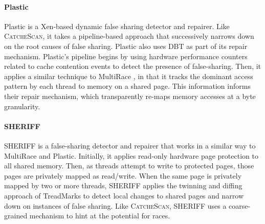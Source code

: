 \documentclass{sig-alternate}
\newcommand{\TextToolname}{CatcheScan}
\newcommand{\Toolname}{\textsc{\TextToolname{}}}
\begin{document}
\paragraph{Plastic}
Plastic \cite{Plastic} is a Xen-based dynamic false sharing detector and repairer. Like \Toolname{}, it takes a pipeline-based
approach that successively narrows down on the root causes of false sharing. Plastic also uses DBT as part of its
repair mechanism. Plastic's pipeline begins by using hardware performance counters related to cache contention
events to detect the presence of false-sharing. Then, it applies a similar technique to MultiRace \cite{MultiRace}, in
that it tracks the dominant access pattern by each thread to memory on a shared page. This information informs
their repair mechanism, which transparently re-maps memory accesses at a byte granularity.

\paragraph{SHERIFF}
SHERIFF \cite{SHERIFF} is a false-sharing detector and repairer that works in a similar way to MultiRace and Plastic. Initially,
it applies read-only hardware page protection to all shared memory. Then, as threads attempt to write to protected pages, those
pages are privately mapped as read/write. When the same page is privately mapped by two or more threads, SHERIFF applies
the twinning and diffing approach of TreadMarks \cite{TreadMarks} to detect local changes to shared pages and narrow down
on instances of false sharing. Like \Toolname{}, SHERIFF uses a coarse-grained mechanism to hint at the potential for races.
\end{document}
